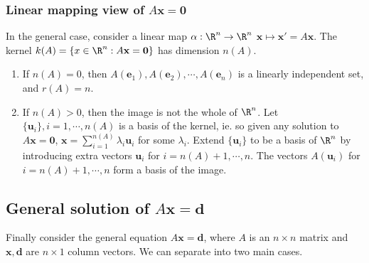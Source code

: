 \documentclass[a4paper]{article}
\begin{document}
\subsubsection{Linear mapping view of \texorpdfstring{$A\mathbf{x} = \mathbf{0}$}{Ax = 0}}
In the general case, consider a linear map $\alpha: \R^n \to \R^n$ $\mathbf{x} \mapsto \mathbf{x}' = A\mathbf{x}$. The kernel $k(A) = \{x\in \R^n: A\mathbf{x} = \mathbf{0}\}$ has dimension $n(A)$.

\begin{enumerate}
  \item If $n(A) = 0$, then $A(\mathbf{e}_1), A(\mathbf{e}_2), \cdots, A(\mathbf{e}_n)$ is a linearly independent set, and $r(A) = n$.
  \item If $n(A) > 0$, then the image is not the whole of $\R^n$. Let $\{\mathbf{u}_i\}, i = 1, \cdots, n(A)$ is a basis of the kernel, ie. so given any solution to $A\mathbf{x} = \mathbf{0}$, $\displaystyle \mathbf{x} = \sum_{i = 1}^{n(A)} \lambda_i \mathbf{u}_i$ for some $\lambda_i$. Extend $\{\mathbf{u}_i\}$ to be a basis of $\R^n$ by introducing extra vectors $\mathbf{u}_{i}$ for $i = n(A) + 1, \cdots, n$. The vectors $A(\mathbf{u}_i)$ for $i = n(A) + 1, \cdots, n$ form a basis of the image.
\end{enumerate}

\subsection{General solution of \texorpdfstring{$A\mathbf{x} = \mathbf{d}$}{Ax = d}}
Finally consider the general equation $A\mathbf{x} = \mathbf{d}$, where $A$ is an $n\times n$ matrix and $\mathbf{x}, \mathbf{d}$ are $n \times 1$ column vectors. We can separate into two main cases.
\end{document}
